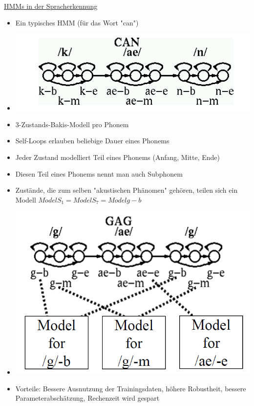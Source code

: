 \documentclass[a4paper,10pt,oneside]{article}
\begin{document}
\underline{HMMs in der Spracherkennung} \\
	\begin{itemize}
		\item Ein typisches HMM (für das Wort "can")
		\item[] \includegraphics[scale=0.2]{Grafiken/1339.png}
		\item 3-Zustands-Bakis-Modell pro Phonem
		\item Self-Loops erlauben beliebige Dauer eines Phonems
		\item Jeder Zustand modelliert Teil eines Phonems (Anfang, Mitte, Ende)
		\item Diesen Teil eines Phonems nennt man auch Subphonem
		\item Zustände, die zum selben "akustischen Phänomen" gehören, teilen sich ein Modell $Model S_1 = Model S_7 = Model g-b$ 
		\item[]\includegraphics[scale=0.2]{Grafiken/1340.png}
		\item Vorteile: Bessere Ausnutzung der Trainingsdaten, höhere Robustheit, bessere Parameterabschätzung, Rechenzeit wird gespart
	\end{itemize}
\end{document}
